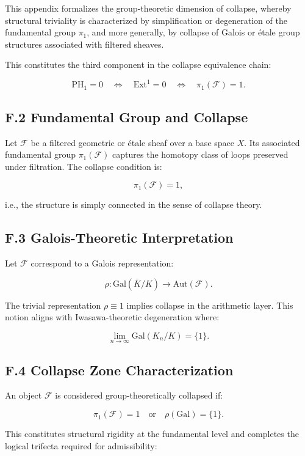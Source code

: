 \documentclass[11pt]{article}
\begin{document}
This appendix formalizes the group-theoretic dimension of collapse, whereby structural triviality is characterized by simplification or degeneration of the fundamental group \( \pi_1 \), and more generally, by collapse of Galois or étale group structures associated with filtered sheaves.

This constitutes the third component in the collapse equivalence chain:

\[
\mathrm{PH}_1 = 0 \quad \iff \quad \mathrm{Ext}^1 = 0 \quad \iff \quad \pi_1(\mathcal{F}) = 1.
\]

\subsection*{F.2 Fundamental Group and Collapse}

Let \( \mathcal{F} \) be a filtered geometric or étale sheaf over a base space \( X \). Its associated fundamental group \( \pi_1(\mathcal{F}) \) captures the homotopy class of loops preserved under filtration. The collapse condition is:

\[
\pi_1(\mathcal{F}) = 1,
\]

i.e., the structure is simply connected in the sense of collapse theory.

\subsection*{F.3 Galois-Theoretic Interpretation}

Let \( \mathcal{F} \) correspond to a Galois representation:

\[
\rho: \mathrm{Gal}(\overline{K}/K) \to \mathrm{Aut}(\mathcal{F}).
\]

The trivial representation \( \rho \equiv 1 \) implies collapse in the arithmetic layer. This notion aligns with Iwasawa-theoretic degeneration where:

\[
\lim_{n \to \infty} \mathrm{Gal}(K_n/K) = \{1\}.
\]

\subsection*{F.4 Collapse Zone Characterization}

An object \( \mathcal{F} \) is considered group-theoretically collapsed if:

\[
\pi_1(\mathcal{F}) = 1 \quad \text{or} \quad \rho(\mathrm{Gal}) = \{1\}.
\]

This constitutes structural rigidity at the fundamental level and completes the logical trifecta required for admissibility:
\end{document}
